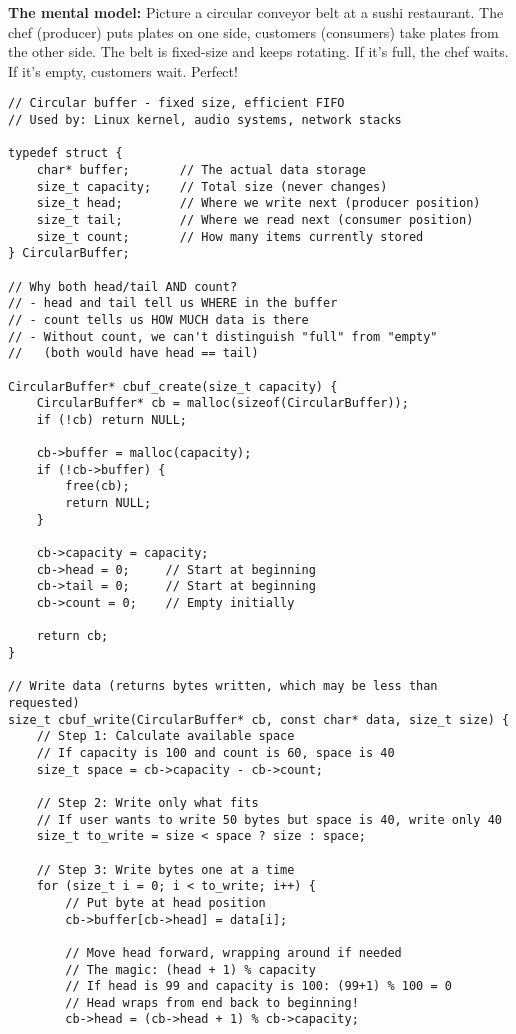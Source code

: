 \textbf{The mental model:} Picture a circular conveyor belt at a sushi restaurant. The chef (producer) puts plates on one side, customers (consumers) take plates from the other side. The belt is fixed-size and keeps rotating. If it's full, the chef waits. If it's empty, customers wait. Perfect!

\begin{lstlisting}
// Circular buffer - fixed size, efficient FIFO
// Used by: Linux kernel, audio systems, network stacks

typedef struct {
    char* buffer;       // The actual data storage
    size_t capacity;    // Total size (never changes)
    size_t head;        // Where we write next (producer position)
    size_t tail;        // Where we read next (consumer position)
    size_t count;       // How many items currently stored
} CircularBuffer;

// Why both head/tail AND count?
// - head and tail tell us WHERE in the buffer
// - count tells us HOW MUCH data is there
// - Without count, we can't distinguish "full" from "empty"
//   (both would have head == tail)

CircularBuffer* cbuf_create(size_t capacity) {
    CircularBuffer* cb = malloc(sizeof(CircularBuffer));
    if (!cb) return NULL;

    cb->buffer = malloc(capacity);
    if (!cb->buffer) {
        free(cb);
        return NULL;
    }

    cb->capacity = capacity;
    cb->head = 0;     // Start at beginning
    cb->tail = 0;     // Start at beginning
    cb->count = 0;    // Empty initially

    return cb;
}

// Write data (returns bytes written, which may be less than requested)
size_t cbuf_write(CircularBuffer* cb, const char* data, size_t size) {
    // Step 1: Calculate available space
    // If capacity is 100 and count is 60, space is 40
    size_t space = cb->capacity - cb->count;

    // Step 2: Write only what fits
    // If user wants to write 50 bytes but space is 40, write only 40
    size_t to_write = size < space ? size : space;

    // Step 3: Write bytes one at a time
    for (size_t i = 0; i < to_write; i++) {
        // Put byte at head position
        cb->buffer[cb->head] = data[i];

        // Move head forward, wrapping around if needed
        // The magic: (head + 1) % capacity
        // If head is 99 and capacity is 100: (99+1) % 100 = 0
        // Head wraps from end back to beginning!
        cb->head = (cb->head + 1) % cb->capacity;


\end{lstlisting}
